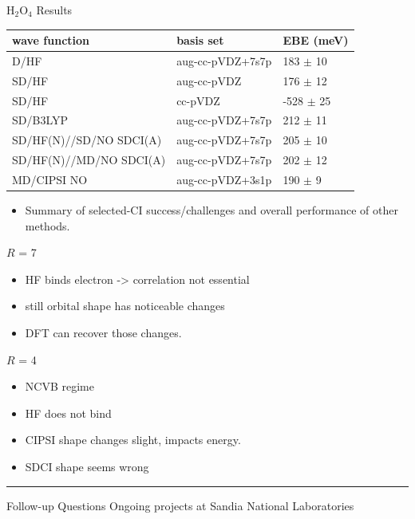 \documentclass[
  letterpaper,
  DIV=11,
  numbers=noendperiod]{scrartcl}
\providecommand{\tightlist}{%
  \setlength{\itemsep}{0pt}\setlength{\parskip}{0pt}}\usepackage{longtable,booktabs,array}
\begin{document}
H\(_2\)O\(_4\) Results

\begin{longtable}[]{@{}lll@{}}
\toprule()
wave function & basis set & EBE (meV) \\
\midrule()
\endhead
D/HF & aug-cc-pVDZ+7s7p & 183 \(\pm\) 10 \\
SD/HF & aug-cc-pVDZ & 176 \(\pm\) 12 \\
SD/HF & cc-pVDZ & -528 \(\pm\) 25 \\
SD/B3LYP & aug-cc-pVDZ+7s7p & 212 \(\pm\) 11 \\
SD/HF(N)//SD/NO SDCI(A) & aug-cc-pVDZ+7s7p & 205 \(\pm\) 10 \\
SD/HF(N)//MD/NO SDCI(A) & aug-cc-pVDZ+7s7p & 202 \(\pm\) 12 \\
MD/CIPSI NO & aug-cc-pVDZ+3s1p & 190 \(\pm\) 9 \\
\bottomrule()
\end{longtable}

\begin{itemize}
\tightlist
\item
  Summary of selected-CI success/challenges and overall performance of
  other methods.
\end{itemize}

\(R\) = 7

\begin{itemize}
\tightlist
\item
  HF binds electron -\textgreater{} correlation not essential
\item
  still orbital shape has noticeable changes
\item
  DFT can recover those changes.
\end{itemize}

\(R\) = 4

\begin{itemize}
\tightlist
\item
  NCVB regime
\item
  HF does not bind
\item
  CIPSI shape changes slight, impacts energy.
\item
  SDCI shape seems wrong
\end{itemize}

\begin{center}\rule{0.5\linewidth}{0.5pt}\end{center}

\leavevmode{}%
Follow-up Questions {Ongoing projects at Sandia National Laboratories }
\end{document}
